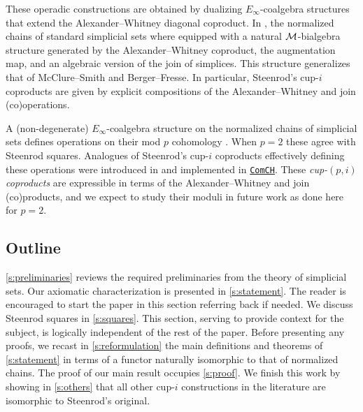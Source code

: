 These operadic constructions are obtained by dualizing $E_\infty$-coalgebra structures that extend the Alexander--Whitney diagonal coproduct.
In \cite{medina2020prop1}, the normalized chains of standard simplicial sets where equipped with a natural $\operatorname{\mathcal{M}}$-bialgebra structure generated by the Alexander--Whitney coproduct, the augmentation map, and an algebraic version of the join of simplices.
This structure generalizes that of McClure--Smith and Berger--Fresse.
In particular, Steenrod's \mbox{cup-$i$} coproducts are given by explicit compositions of the Alexander--Whitney and join (co)operations.

A (non-degenerate) $E_\infty$-coalgebra structure on the normalized chains of simplicial sets defines operations on their mod $p$ cohomology \cite{steenrod1953cyclic, may1970general}.
When $p = 2$ these agree with Steenrod squares.
Analogues of Steenrod's \mbox{cup-$i$} coproducts effectively defining these operations were introduced in \cite{medina2021may_st} and implemented in \href{https://github.com/ammedmar/comch}{\texttt{ComCH}}.
These \textit{cup-$(p,i)$ coproducts} are expressible in terms of the Alexander--Whitney and join (co)products, and we expect to study their moduli in future work as done here for $p=2$.

\subsection*{Outline}

\cref{s:preliminaries} reviews the required preliminaries from the theory of simplicial sets.
Our axiomatic characterization is presented in \cref{s:statement}.
The reader is encouraged to start the paper in this section referring back if needed.
We discuss Steenrod squares in \cref{s:squares}.
This section, serving to provide context for the subject, is logically independent of the rest of the paper.
Before presenting any proofs, we recast in \cref{s:reformulation} the main definitions and theorems of \cref{s:statement} in terms of a functor naturally isomorphic to that of normalized chains.
The proof of our main result occupies \cref{s:proof}.
We finish this work by showing in \cref{s:others} that all other \mbox{cup-$i$} constructions in the literature are isomorphic to Steenrod's original.

